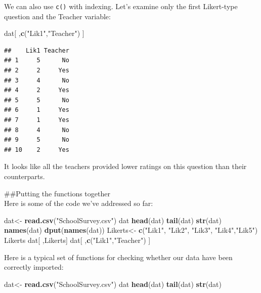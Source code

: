 \documentclass[]{tufte-handout}
\newenvironment{Shaded}{}{}
\newcommand{\KeywordTok}[1]{\textcolor[rgb]{0.00,0.44,0.13}{\textbf{#1}}}
\newcommand{\NormalTok}[1]{#1}
\newcommand{\StringTok}[1]{\textcolor[rgb]{0.25,0.44,0.63}{#1}}
\begin{document}
We can also use \texttt{c()} with indexing. Let's examine only the first
Likert-type question and the Teacher variable:

\begin{Shaded}
\begin{Highlighting}[]
\NormalTok{dat[ ,}\KeywordTok{c}\NormalTok{(}\StringTok{"Lik1"}\NormalTok{,}\StringTok{"Teacher"}\NormalTok{) ]}
\end{Highlighting}
\end{Shaded}

\begin{verbatim}
##    Lik1 Teacher
## 1     5      No
## 2     2     Yes
## 3     4      No
## 4     2     Yes
## 5     5      No
## 6     1     Yes
## 7     1     Yes
## 8     4      No
## 9     5      No
## 10    2     Yes
\end{verbatim}

It looks like all the teachers provided lower ratings on this question
than their counterparts.

\#\#Putting the functions together\\
Here is some of the code we've addressed so far:

\begin{Shaded}
\begin{Highlighting}[]
\NormalTok{dat<-}\StringTok{ }\KeywordTok{read.csv}\NormalTok{(}\StringTok{"SchoolSurvey.csv"}\NormalTok{)}
\NormalTok{dat}
\KeywordTok{head}\NormalTok{(dat)}
\KeywordTok{tail}\NormalTok{(dat)}
\KeywordTok{str}\NormalTok{(dat)}
\KeywordTok{names}\NormalTok{(dat)}
\KeywordTok{dput}\NormalTok{(}\KeywordTok{names}\NormalTok{(dat))}
\NormalTok{Likerts<-}\StringTok{ }\KeywordTok{c}\NormalTok{(}\StringTok{"Lik1"}\NormalTok{, }\StringTok{"Lik2"}\NormalTok{, }\StringTok{"Lik3"}\NormalTok{, }\StringTok{"Lik4"}\NormalTok{,}\StringTok{"Lik5"}\NormalTok{)}
\NormalTok{Likerts}
\NormalTok{dat[ ,Likerts]}
\NormalTok{dat[ ,}\KeywordTok{c}\NormalTok{(}\StringTok{"Lik1"}\NormalTok{,}\StringTok{"Teacher"}\NormalTok{) ]}
\end{Highlighting}
\end{Shaded}

Here is a typical set of functions for checking whether our data have
been correctly imported:

\begin{Shaded}
\begin{Highlighting}[]
\NormalTok{dat<-}\StringTok{ }\KeywordTok{read.csv}\NormalTok{(}\StringTok{"SchoolSurvey.csv"}\NormalTok{)}
\NormalTok{dat}
\KeywordTok{head}\NormalTok{(dat)}
\KeywordTok{tail}\NormalTok{(dat)}
\KeywordTok{str}\NormalTok{(dat)}
\end{Highlighting}
\end{Shaded}
\end{document}
